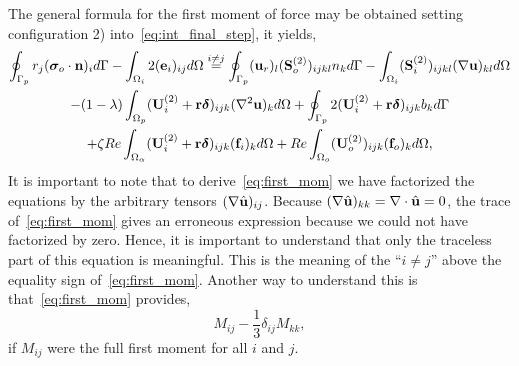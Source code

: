 The general formula for the first moment of force may be obtained setting configuration 2) into~\ref{eq:int_final_step}, it yields,
\begin{multline}
    \intS[p]{r_j(\bm\sigma_{o}\cdot \textbf{n})_i}
    - \intO[i]{2(\textbf{e}_i)_{ij}}
    \overset{i\neq j}{=}
    \intS[p]{(\textbf{u}_{r})_l (\textbf{S}^{(2)}_{o})_{ijkl} n_k}
    - \intO[i]{(\textbf{S}^{(2)}_{i})_{ijkl}(\grad\textbf{u})_{kl}}\\
    - (1-\lambda) \intO[p]{(\textbf{U}_{i}^{(2)} + \textbf{r}\bm\delta)_{ijk} (\grad^2 \textbf{u})_k }
    + \intS[p]{2(\textbf{U}_{i}^{(2)} + \textbf{r}\bm\delta)_{ijk} b_k}\\
    + \zeta Re \intO{(\textbf{U}_{i}^{(2)} + \textbf{r}\bm\delta)_{ijk} (\textbf{f}_{i})_k} 
    + Re\intO[o]{(\textbf{U}_{o}^{(2)})_{ijk}(\textbf{f}_{o})_k},
    \label{eq:first_mom}
\end{multline}
It is important to note that to derive~\ref{eq:first_mom} we have factorized the equations by the arbitrary tensors $(\mathbf{\nabla} \hat{\textbf{u}})_{ij}$. 
Because $(\mathbf{\nabla} \hat{\textbf{u}})_{kk}=\mathbf{\nabla}\cdot \hat{\textbf{u}} = 0$, the trace of~\ref{eq:first_mom} gives an erroneous expression because we could not have factorized by zero.  
Hence, it is important to understand that only the traceless part of this equation is meaningful. 
This is the meaning of the ``$i\neq j$'' above the equality sign of~\ref{eq:first_mom}. 
Another way to understand this is that~\ref{eq:first_mom} provides,
\begin{equation}
    M_{ij} - \frac{1}{3}\delta_{ij}M_{kk},
\end{equation}
if $M_{ij}$ were the full first moment for all $i$ and $j$. 

